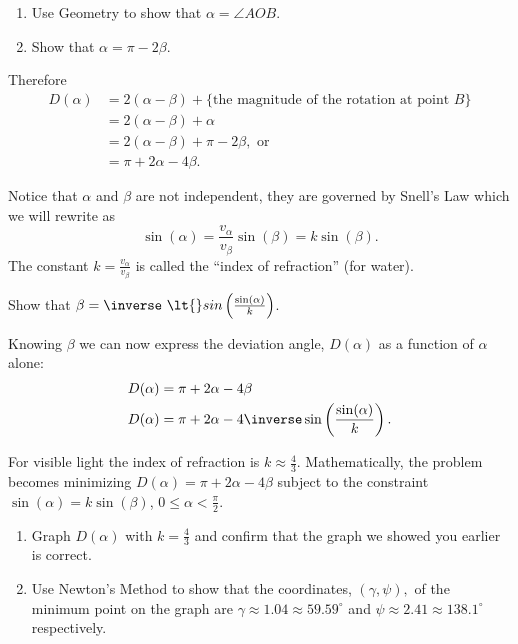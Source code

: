 \begin{ProficiencyDrill}
  \begin{enumerate}[label={\bf{}(\alph*)}]
  \item   Use Geometry to show that $\alpha=\angle AOB$.
  \item Show that $\alpha=\pi-2\beta$. 
  \end{enumerate}
\end{ProficiencyDrill}
Therefore
\begin{align*}
  D(\alpha) &= 2(\alpha-\beta) + \{\text{the magnitude of the
              rotation at point  $B$}\}\\
            &= 2(\alpha-\beta) + \alpha\\
            &= 2(\alpha-\beta) + \pi-2\beta, \text{ or}\\
            &= \pi+2\alpha-4\beta.
\end{align*}

Notice that $\alpha$ and $\beta$ are not independent, they are governed by Snell's
Law which we will rewrite as
\begin{equation}
  \sin(\alpha)=\frac{v_{\alpha}}{v_{\beta}}\sin(\beta)=k\sin(\beta).\label{eq:IndRef}
\end{equation}
The constant $k=\frac{v_{\alpha}}{v_{\beta}}$ is called  the ``index of refraction'' (for
water).

\begin{ProficiencyDrill}
  Show that $\beta=\inverse\ \lt{}sin\left(\frac{\sin(\alpha)}{k}\right)$.
\end{ProficiencyDrill}
Knowing $\beta$ we can now express the deviation angle,
$D(\alpha)$ as a function of $\alpha$ alone:
\begin{align*}
  D(\alpha) &= \pi+2\alpha-4\beta \\
  D(\alpha) &= \pi+2\alpha-4\inverse\sin\left(\frac{\sin(\alpha)}{k}\right).
\end{align*}

\begin{embeddedproblem}
  For visible light  the index of refraction
  is $k\approx\frac43$. Mathematically, the problem becomes minimizing
  $D(\alpha)=\pi+2\alpha-4\beta$ subject to the constraint
  $\sin(\alpha)=k\sin(\beta)$, $ 0\le\alpha\lt{}\frac{\pi}{2} $.

  \begin{enumerate}[label={\bf{}(\alph*)}]
  \item Graph $D(\alpha)$ with $k=\frac43$ and confirm that the graph
    we showed you earlier is correct.
  \item Use Newton's Method to show that the coordinates,
    $(\gamma,\psi),$
    of the minimum point on the graph are $\gamma\approx1.04\approx59.59^\circ$ and
    $\psi\approx2.41\approx138.1^\circ$ respectively.
  \end{enumerate}
\end{embeddedproblem}

